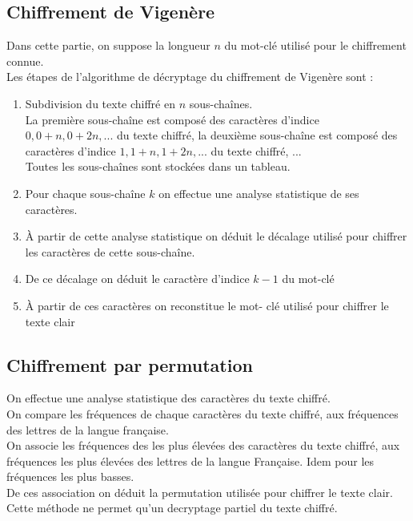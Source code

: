 \documentclass{article}
\begin{document}
\vspace{2\baselineskip}

\subsection{Chiffrement de Vigenère}
\vspace{1\baselineskip}

Dans cette partie, on suppose la longueur $n$ du mot-clé utilisé pour le chiffrement connue. \\
Les étapes de l'algorithme de décryptage du chiffrement de Vigenère sont : \\
\begin{enumerate}
\item Subdivision du texte chiffré en $n$ sous-chaînes. \\
La première sous-chaîne est composé des caractères d'indice $0, 0+n, 0+2n, ...$ du texte chiffré, la deuxième sous-chaîne est composé des caractères d'indice $1, 1+n, 1+2n, ...$ du texte chiffré, ... \\
Toutes les sous-chaînes sont stockées dans un tableau. \\
\item Pour chaque sous-chaîne $k$ on effectue une analyse statistique de ses caractères.
\item À partir de cette analyse statistique on déduit le décalage utilisé pour chiffrer les caractères de cette sous-chaîne.
\item De ce décalage on déduit le caractère d'indice $k-1$ du mot-clé
\item À partir de ces caractères on reconstitue le mot- clé utilisé pour chiffrer le texte clair
\end{enumerate}
\vspace{2\baselineskip}

\subsection{Chiffrement par permutation}
\vspace{1\baselineskip}

On effectue une analyse statistique des caractères du texte chiffré. \\
On compare les fréquences de chaque caractères du texte chiffré, aux fréquences des lettres de la langue française. \\
On associe les fréquences des les plus élevées des caractères du texte chiffré, aux fréquences les plus élevées des lettres de la langue Française. Idem pour les fréquences les plus basses. \\
De ces association on déduit la permutation utilisée pour chiffrer le texte clair. \\
Cette méthode ne permet qu'un decryptage partiel du texte chiffré. \\
\vspace{2\baselineskip}
\end{document}
